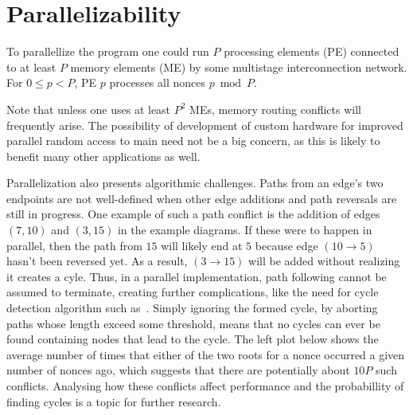 \documentclass[11pt, oneside]{article}
\begin{document}
\section{Parallelizability}
To parallellize the program one could run $P$ processing elements (PE) connected to at
least $P$ memory elements (ME) by some multistage interconnection network.
For $0\leq p < P$, PE $p$ processes all nonces $p \bmod P$.

Note that unless one uses at least $P^2$ MEs, memory routing conflicts will frequently arise.
The possibility of development of custom hardware for improved parallel random access to main
need not be a big concern, as this is likely to benefit many other applications as well.

Parallelization also presents algorithmic challenges. Paths from an edge's two endpoints
are not well-defined when other edge additions and path reversals are still in progress.
One example of such a path conflict is the addition of edges
$(7,10)$ and $(3,15)$ in the example diagrams. If these were to happen in parallel,
then the path from $15$ will likely end at $5$ because
edge $(10 \rightarrow 5)$ hasn't been reversed yet.
As a result, $(3 \rightarrow 15)$ will be added without realizing it creates a cyle.
Thus, in a parallel implementation, path following cannot be assumed to terminate,
creating further complications, like the need for cycle detection algorithm
such as~\cite{1980-brent-cycles}. Simply ignoring the formed cycle, by aborting paths whose length
exceed some threshold, means that no cycles can ever be found containing nodes that lead to the cycle.
The left plot below shows the average number of times that either of the two roots
for a nonce occurred a given number of nonces ago, which suggests that there are potentially
about $10P$ such conflicts.
Analysing how these conflicts affect performance and the probabillity of finding cycles
is a topic for further research. 
\end{document}
